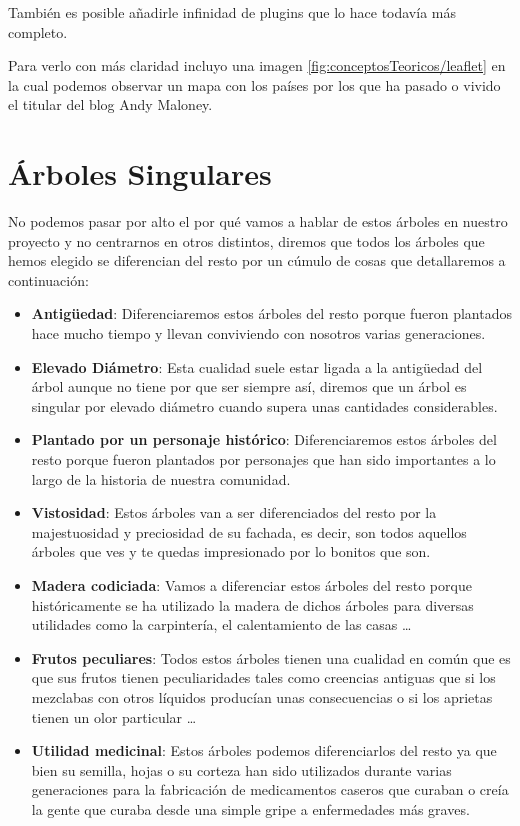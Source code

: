 También es posible añadirle infinidad de plugins que lo hace todavía más completo.

Para verlo con más claridad incluyo una imagen \ref{fig:conceptosTeoricos/leaflet} en la cual podemos observar un mapa con los países por los que ha pasado o vivido el titular del blog Andy Maloney.

\newpage

\section{Árboles Singulares}

No podemos pasar por alto el por qué vamos a hablar de estos árboles en nuestro proyecto y no centrarnos en otros distintos, diremos que todos los árboles que hemos elegido se diferencian del resto por un cúmulo de cosas que detallaremos a continuación:

\begin{itemize}
	\item \textbf{Antigüedad}: Diferenciaremos estos árboles del resto porque fueron plantados hace mucho tiempo y llevan conviviendo con nosotros varias generaciones.  
	\item \textbf{Elevado Diámetro}: Esta cualidad suele estar ligada a la antigüedad del árbol aunque no tiene por que ser siempre así, diremos que un árbol es singular por elevado diámetro cuando supera unas cantidades considerables.
	\item \textbf{Plantado por un personaje histórico}: Diferenciaremos estos árboles del resto porque fueron plantados por personajes que han sido importantes a lo largo de la historia de nuestra comunidad.
	\item \textbf{Vistosidad}: Estos árboles van a ser diferenciados del resto por la majestuosidad y preciosidad de su fachada, es decir, son todos aquellos árboles que ves y te quedas impresionado por lo bonitos que son. 
	\item \textbf{Madera codiciada}: Vamos a diferenciar estos árboles del resto porque históricamente se ha utilizado la madera de dichos árboles para diversas utilidades como la carpintería, el calentamiento de las casas \ldots
	\item \textbf{Frutos peculiares}: Todos estos árboles tienen una cualidad en común que es que sus frutos tienen peculiaridades tales como creencias antiguas que si los mezclabas con otros líquidos producían unas consecuencias o si los aprietas tienen un olor particular \ldots
	\item \textbf{Utilidad medicinal}: Estos árboles podemos diferenciarlos del resto ya que bien su semilla, hojas o su corteza han sido utilizados durante varias generaciones para la fabricación de medicamentos caseros que curaban o creía la gente que curaba desde una simple gripe a enfermedades más graves.
\end{itemize}
